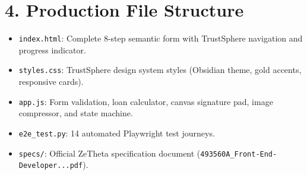 \documentclass[11pt,a4paper]{article}
\begin{document}
\section{4. Production File Structure}
\begin{itemize}[leftmargin=1.5em, itemsep=2pt]
    \item \texttt{index.html}: Complete 8-step semantic form with TrustSphere navigation and progress indicator.
    \item \texttt{styles.css}: TrustSphere design system styles (Obsidian theme, gold accents, responsive cards).
    \item \texttt{app.js}: Form validation, loan calculator, canvas signature pad, image compressor, and state machine.
    \item \texttt{e2e\_test.py}: 14 automated Playwright test journeys.
    \item \texttt{specs/}: Official ZeTheta specification document (\texttt{493560A\_Front-End-Developer...pdf}).
\end{itemize}
\end{document}
